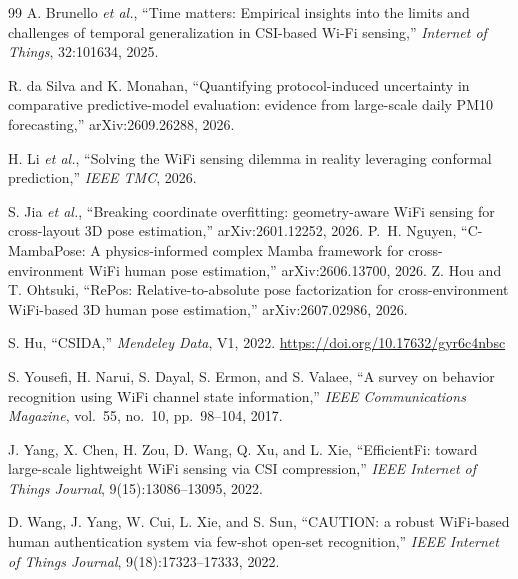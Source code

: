 \documentclass[11pt]{article}
\theoremstyle{definition}
\newcommand{\etal}{\textit{et al.}}
\begin{document}
\begin{thebibliography}{99}
 A. Brunello \etal, ``Time matters: Empirical insights into the limits and challenges of temporal generalization in CSI-based Wi-Fi sensing,'' \emph{Internet of Things}, 32:101634, 2025.

 R. da Silva and K. Monahan, ``Quantifying protocol-induced uncertainty in comparative predictive-model evaluation: evidence from large-scale daily PM10 forecasting,'' arXiv:2609.26288, 2026.

 H. Li \etal, ``Solving the WiFi sensing dilemma in reality leveraging conformal prediction,'' \emph{IEEE TMC}, 2026.

 S. Jia \etal, ``Breaking coordinate overfitting: geometry-aware WiFi sensing for cross-layout 3D pose estimation,'' arXiv:2601.12252, 2026.
 P.~H. Nguyen, ``C-MambaPose: A physics-informed complex Mamba framework for cross-environment WiFi human pose estimation,'' arXiv:2606.13700, 2026.
 Z. Hou and T. Ohtsuki, ``RePos: Relative-to-absolute pose factorization for cross-environment WiFi-based 3D human pose estimation,'' arXiv:2607.02986, 2026.

 S. Hu, ``CSIDA,'' \emph{Mendeley Data}, V1, 2022. \url{https://doi.org/10.17632/gyr6c4nbsc}

 S. Yousefi, H. Narui, S. Dayal, S. Ermon, and S. Valaee, ``A survey on behavior recognition using WiFi channel state information,'' \emph{IEEE Communications Magazine}, vol.~55, no.~10, pp.~98--104, 2017.

 J. Yang, X. Chen, H. Zou, D. Wang, Q. Xu, and L. Xie, ``EfficientFi: toward large-scale lightweight WiFi sensing via CSI compression,'' \emph{IEEE Internet of Things Journal}, 9(15):13086--13095, 2022.

 D. Wang, J. Yang, W. Cui, L. Xie, and S. Sun, ``CAUTION: a robust WiFi-based human authentication system via few-shot open-set recognition,'' \emph{IEEE Internet of Things Journal}, 9(18):17323--17333, 2022.

\end{thebibliography}
\end{document}
